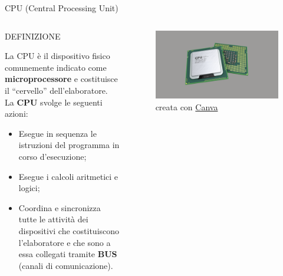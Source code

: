 \documentclass[aspectratio=1610]{beamer}
\begin{document}
\begin{frame}{CPU (Central Processing Unit)}
    \begin{columns}
            \begin{alertblock}{DEFINIZIONE}
                \begin{minipage}{0.96\linewidth}
                    \justifying
                    La CPU è il dispositivo fisico comunemente indicato come \textbf{microprocessore} e 
                    costituisce il ``cervello'' dell'elaboratore. \\ La \textbf{CPU} svolge le seguenti azioni:
                    \begin{itemize}
                        \justifying
                        \item Esegue in sequenza le istruzioni del programma in corso d'esecuzione;
                        \item Esegue i calcoli aritmetici e logici;
                        \item Coordina e sincronizza tutte le attività dei dispositivi che costituiscono l'elaboratore e 
                        che sono a essa collegati tramite \textbf{BUS} (canali di comunicazione).
                    \end{itemize}
                \end{minipage}
            \end{alertblock}
            \begin{figure}
                \includegraphics[width=\linewidth]{img/cpu.png}
                \caption{{creata con \href{https://www.canva.com}{Canva}}}
            \end{figure}
    \end{columns}
\end{frame}
\end{document}

